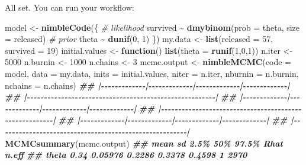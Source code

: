 \documentclass[
  12pt,
]{krantz}
\newenvironment{Shaded}{\begin{snugshade}}{\end{snugshade}}
\newcommand{\AttributeTok}[1]{\textcolor[rgb]{0.13,0.29,0.53}{#1}}
\newcommand{\CommentTok}[1]{\textcolor[rgb]{0.56,0.35,0.01}{\textit{#1}}}
\newcommand{\ControlFlowTok}[1]{\textcolor[rgb]{0.13,0.29,0.53}{\textbf{#1}}}
\newcommand{\DecValTok}[1]{\textcolor[rgb]{0.00,0.00,0.81}{#1}}
\newcommand{\DocumentationTok}[1]{\textcolor[rgb]{0.56,0.35,0.01}{\textbf{\textit{#1}}}}
\newcommand{\FunctionTok}[1]{\textcolor[rgb]{0.13,0.29,0.53}{\textbf{#1}}}
\newcommand{\NormalTok}[1]{#1}
\newcommand{\OtherTok}[1]{\textcolor[rgb]{0.56,0.35,0.01}{#1}}
\newcommand{\SpecialCharTok}[1]{\textcolor[rgb]{0.81,0.36,0.00}{\textbf{#1}}}
\begin{document}
All set. You can run your workflow:

\begin{Shaded}
\begin{Highlighting}[]
\NormalTok{model }\OtherTok{\textless{}{-}} \FunctionTok{nimbleCode}\NormalTok{(\{}
 \CommentTok{\# likelihood}
\NormalTok{ survived }\SpecialCharTok{\textasciitilde{}} \FunctionTok{dmybinom}\NormalTok{(}\AttributeTok{prob =}\NormalTok{ theta, }\AttributeTok{size =}\NormalTok{ released)}
 \CommentTok{\# prior}
\NormalTok{ theta }\SpecialCharTok{\textasciitilde{}} \FunctionTok{dunif}\NormalTok{(}\DecValTok{0}\NormalTok{, }\DecValTok{1}\NormalTok{)}
\NormalTok{\})}
\NormalTok{my.data }\OtherTok{\textless{}{-}} \FunctionTok{list}\NormalTok{(}\AttributeTok{released =} \DecValTok{57}\NormalTok{, }\AttributeTok{survived =} \DecValTok{19}\NormalTok{)}
\NormalTok{initial.values }\OtherTok{\textless{}{-}} \ControlFlowTok{function}\NormalTok{() }\FunctionTok{list}\NormalTok{(}\AttributeTok{theta =} \FunctionTok{runif}\NormalTok{(}\DecValTok{1}\NormalTok{,}\DecValTok{0}\NormalTok{,}\DecValTok{1}\NormalTok{))}
\NormalTok{n.iter }\OtherTok{\textless{}{-}} \DecValTok{5000}
\NormalTok{n.burnin }\OtherTok{\textless{}{-}} \DecValTok{1000}
\NormalTok{n.chains }\OtherTok{\textless{}{-}} \DecValTok{3}
\NormalTok{mcmc.output }\OtherTok{\textless{}{-}} \FunctionTok{nimbleMCMC}\NormalTok{(}\AttributeTok{code =}\NormalTok{ model,}
                          \AttributeTok{data =}\NormalTok{ my.data,}
                          \AttributeTok{inits =}\NormalTok{ initial.values,}
                          \AttributeTok{niter =}\NormalTok{ n.iter,}
                          \AttributeTok{nburnin =}\NormalTok{ n.burnin,}
                          \AttributeTok{nchains =}\NormalTok{ n.chains)}
\DocumentationTok{\#\# |{-}{-}{-}{-}{-}{-}{-}{-}{-}{-}{-}{-}{-}|{-}{-}{-}{-}{-}{-}{-}{-}{-}{-}{-}{-}{-}|{-}{-}{-}{-}{-}{-}{-}{-}{-}{-}{-}{-}{-}|{-}{-}{-}{-}{-}{-}{-}{-}{-}{-}{-}{-}{-}|}
\DocumentationTok{\#\# |{-}{-}{-}{-}{-}{-}{-}{-}{-}{-}{-}{-}{-}{-}{-}{-}{-}{-}{-}{-}{-}{-}{-}{-}{-}{-}{-}{-}{-}{-}{-}{-}{-}{-}{-}{-}{-}{-}{-}{-}{-}{-}{-}{-}{-}{-}{-}{-}{-}{-}{-}{-}{-}{-}{-}|}
\DocumentationTok{\#\# |{-}{-}{-}{-}{-}{-}{-}{-}{-}{-}{-}{-}{-}|{-}{-}{-}{-}{-}{-}{-}{-}{-}{-}{-}{-}{-}|{-}{-}{-}{-}{-}{-}{-}{-}{-}{-}{-}{-}{-}|{-}{-}{-}{-}{-}{-}{-}{-}{-}{-}{-}{-}{-}|}
\DocumentationTok{\#\# |{-}{-}{-}{-}{-}{-}{-}{-}{-}{-}{-}{-}{-}{-}{-}{-}{-}{-}{-}{-}{-}{-}{-}{-}{-}{-}{-}{-}{-}{-}{-}{-}{-}{-}{-}{-}{-}{-}{-}{-}{-}{-}{-}{-}{-}{-}{-}{-}{-}{-}{-}{-}{-}{-}{-}|}
\DocumentationTok{\#\# |{-}{-}{-}{-}{-}{-}{-}{-}{-}{-}{-}{-}{-}|{-}{-}{-}{-}{-}{-}{-}{-}{-}{-}{-}{-}{-}|{-}{-}{-}{-}{-}{-}{-}{-}{-}{-}{-}{-}{-}|{-}{-}{-}{-}{-}{-}{-}{-}{-}{-}{-}{-}{-}|}
\DocumentationTok{\#\# |{-}{-}{-}{-}{-}{-}{-}{-}{-}{-}{-}{-}{-}{-}{-}{-}{-}{-}{-}{-}{-}{-}{-}{-}{-}{-}{-}{-}{-}{-}{-}{-}{-}{-}{-}{-}{-}{-}{-}{-}{-}{-}{-}{-}{-}{-}{-}{-}{-}{-}{-}{-}{-}{-}{-}|}
\FunctionTok{MCMCsummary}\NormalTok{(mcmc.output)}
\DocumentationTok{\#\#       mean      sd   2.5\%    50\%  97.5\% Rhat n.eff}
\DocumentationTok{\#\# theta 0.34 0.05976 0.2286 0.3378 0.4598    1  2970}
\end{Highlighting}
\end{Shaded}
\end{document}
